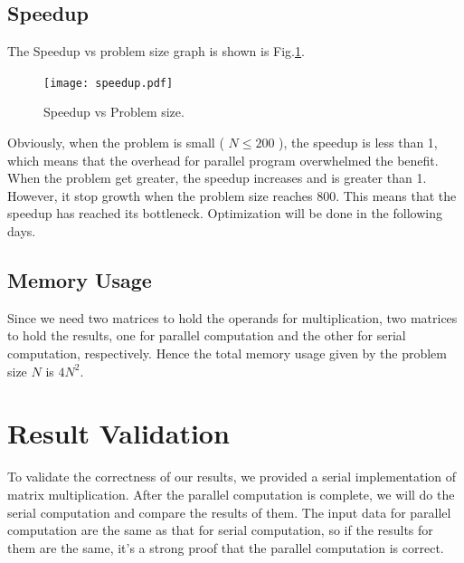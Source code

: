 \documentclass[12pt]{article}
\begin{document}
\subsection{Speedup}
The Speedup vs problem size graph is shown is Fig.\ref{fig:speedup}.
\begin{figure}[h!]
	\begin{center}
		\texttt{[image: speedup.pdf]}
		\caption{\label{fig:speedup}Speedup vs Problem size.}
	\end{center}
\end{figure}

Obviously, when the problem is small ( $N \le 200$ ), the speedup 
is less than 1, which means that the overhead for parallel program 
overwhelmed the benefit. When the problem get greater, the speedup
increases and is greater than 1. However, it stop growth when the 
problem size reaches 800. This means that the speedup has reached 
its bottleneck. Optimization will be done in the following days.

\subsection{Memory Usage}
Since we need two matrices to hold the operands for 
multiplication, two matrices to hold the results, one for 
parallel computation and the other for serial computation, 
respectively. Hence the total memory usage given by the 
problem size $N$ is $4N^{2}$.

\section{Result Validation}
To validate the correctness of our results, we provided a serial
implementation of matrix multiplication. After the parallel 
computation is complete, we will do the serial computation and
compare the results of them. The input data for parallel 
computation are the same as that for serial computation, so if 
the results for them are the same, it's a strong proof that 
the parallel computation is correct.
\end{document}
